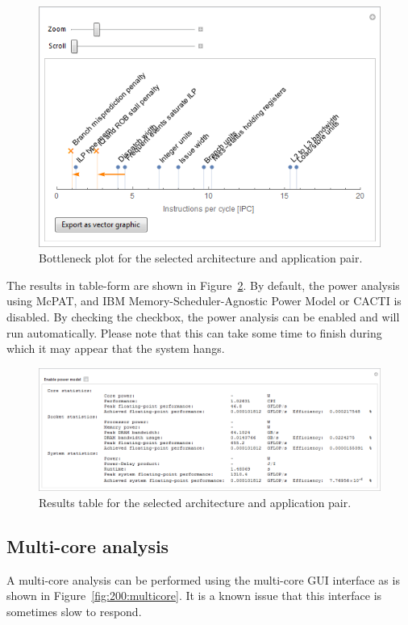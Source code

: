 \begin{figure}
  \centering
  \includegraphics[width=0.7\columnwidth]{img/bottleneckplot.png}
  \caption{Bottleneck plot for the selected architecture and application pair.}
  \label{fig:200:bottleneckplot}
\end{figure}

The results in table-form are shown in Figure~\ref{fig:200:resultstable}. By default, the power analysis using McPAT, and IBM Memory-Scheduler-Agnostic Power Model or CACTI is disabled. By checking the checkbox, the power analysis can be enabled and will run automatically. Please note that this can take some time to finish during which it may appear that the system hangs.

\begin{figure}
  \centering
  \includegraphics[width=0.9\columnwidth]{img/resultstable.png}
  \caption{Results table for the selected architecture and application pair.}
  \label{fig:200:resultstable}
\end{figure}

\subsection{Multi-core analysis}

A multi-core analysis can be performed using the multi-core GUI interface as is shown in Figure~\ref{fig:200:multicore}. It is a known issue that this interface is sometimes slow to respond.

